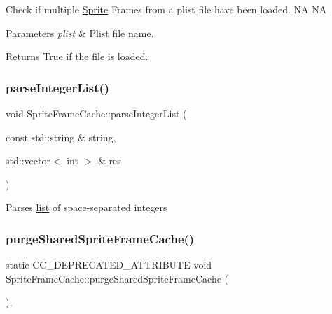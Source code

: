 Check if multiple \hyperlink{classSprite}{Sprite} Frames from a plist file have been loaded.  NA  NA


\begin{DoxyParams}{Parameters}
{\em plist} & Plist file name. \\
\hline
\end{DoxyParams}
\begin{DoxyReturn}{Returns}
True if the file is loaded. 
\end{DoxyReturn}
\mbox{\label{classSpriteFrameCache_a22d62d43f4b058295c01f299353f3051}} 
\subsubsection{\texorpdfstring{parse\+Integer\+List()}{parseIntegerList()}}
{\footnotesize\ttfamily void Sprite\+Frame\+Cache\+::parse\+Integer\+List (\begin{DoxyParamCaption}\item[{const std\+::string \&}]{string,  }\item[{std\+::vector$<$ int $>$ \&}]{res }\end{DoxyParamCaption})\hspace{0.3cm}{\ttfamily [protected]}}

Parses \hyperlink{protocollist-p}{list} of space-\/separated integers \mbox{\label{classSpriteFrameCache_a56768e2b3b8574dbe135862684548562}} 
\subsubsection{\texorpdfstring{purge\+Shared\+Sprite\+Frame\+Cache()}{purgeSharedSpriteFrameCache()}\hspace{0.1cm}{\footnotesize\ttfamily [1/2]}}
{\footnotesize\ttfamily static C\+C\+\_\+\+D\+E\+P\+R\+E\+C\+A\+T\+E\+D\+\_\+\+A\+T\+T\+R\+I\+B\+U\+TE void Sprite\+Frame\+Cache\+::purge\+Shared\+Sprite\+Frame\+Cache (\begin{DoxyParamCaption}{ }\end{DoxyParamCaption})\hspace{0.3cm}{\ttfamily [inline]}, {\ttfamily [static]}}

